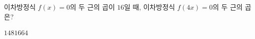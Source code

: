 이차방정식 $f(x)=0$의 두 근의 곱이 $16$일 때, 이차방정식 $f(4x)=0$의 두 근의 곱은?
\begin{choices32}{$1$}{$4$}{$8$}{$16$}{$64$}\end{choices32}
